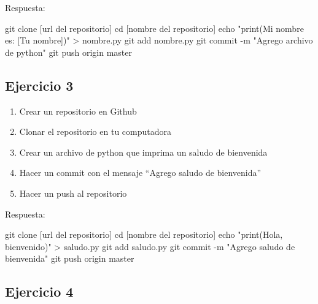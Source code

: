 \documentclass[
  a4paper,
  DIV=11,
  numbers=noendperiod,
  onepage,
  openany]{scrreprt}
\newenvironment{Shaded}{\begin{snugshade}}{\end{snugshade}}
\newcommand{\AttributeTok}[1]{\textcolor[rgb]{0.40,0.45,0.13}{#1}}
\newcommand{\BuiltInTok}[1]{\textcolor[rgb]{0.00,0.23,0.31}{#1}}
\newcommand{\FunctionTok}[1]{\textcolor[rgb]{0.28,0.35,0.67}{#1}}
\newcommand{\NormalTok}[1]{\textcolor[rgb]{0.00,0.23,0.31}{#1}}
\newcommand{\OperatorTok}[1]{\textcolor[rgb]{0.37,0.37,0.37}{#1}}
\newcommand{\StringTok}[1]{\textcolor[rgb]{0.13,0.47,0.30}{#1}}
\providecommand{\tightlist}{%
  \setlength{\itemsep}{0pt}\setlength{\parskip}{0pt}}\usepackage{longtable,booktabs,array}
\begin{document}
Respuesta:

\begin{Shaded}
\begin{Highlighting}[]
\FunctionTok{git}\NormalTok{ clone [url del repositorio]}
\BuiltInTok{cd}\NormalTok{ [nombre del repositorio]}
\BuiltInTok{echo} \StringTok{"print(\textquotesingle{}Mi nombre es: [Tu nombre]\textquotesingle{})"} \OperatorTok{\textgreater{}}\NormalTok{ nombre.py}
\FunctionTok{git}\NormalTok{ add nombre.py}
\FunctionTok{git}\NormalTok{ commit }\AttributeTok{{-}m} \StringTok{"Agrego archivo de python"}
\FunctionTok{git}\NormalTok{ push origin master}
\end{Highlighting}
\end{Shaded}

\subsection{Ejercicio 3}\label{ejercicio-3}

\begin{enumerate}
\def\labelenumi{\arabic{enumi}.}
\tightlist
\item
  Crear un repositorio en Github
\item
  Clonar el repositorio en tu computadora
\item
  Crear un archivo de python que imprima un saludo de bienvenida
\item
  Hacer un commit con el mensaje ``Agrego saludo de bienvenida''
\item
  Hacer un push al repositorio
\end{enumerate}

Respuesta:

\begin{Shaded}
\begin{Highlighting}[]
\FunctionTok{git}\NormalTok{ clone [url del repositorio]}
\BuiltInTok{cd}\NormalTok{ [nombre del repositorio]}
\BuiltInTok{echo} \StringTok{"print(\textquotesingle{}Hola, bienvenido\textquotesingle{})"} \OperatorTok{\textgreater{}}\NormalTok{ saludo.py}
\FunctionTok{git}\NormalTok{ add saludo.py}
\FunctionTok{git}\NormalTok{ commit }\AttributeTok{{-}m} \StringTok{"Agrego saludo de bienvenida"}
\FunctionTok{git}\NormalTok{ push origin master}
\end{Highlighting}
\end{Shaded}

\subsection{Ejercicio 4}\label{ejercicio-4}
\end{document}
